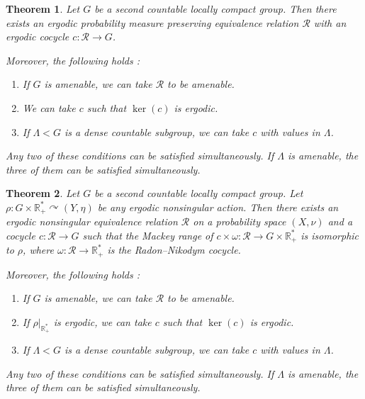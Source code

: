 \documentclass[10pt,a4paper]{amsart}
\newtheorem{theorem}{Theorem}
\newcommand{\R}{\mathbb{R}}
\newcommand{\cR}{\mathcal{R}}
\begin{document}
\begin{theorem} \label{model ergodic kernel dense subgroup measure preserving case}
    Let $G$ be a second countable locally compact group. Then there exists an ergodic probability measure preserving equivalence relation $\cR$ with an ergodic cocycle $c : \cR \rightarrow G$.

    Moreover, the following holds :
    \begin{enumerate}
        \item If $G$ is amenable, we can take $\cR$ to be amenable.
        \item We can take $c$ such that $\ker(c)$ is ergodic.
        \item If $\Lambda < G$ is a dense countable subgroup, we can take $c$ with values in $\Lambda$.
    \end{enumerate}
    Any two of these conditions can be satisfied simultaneously. If $\Lambda$ is amenable, the three of them can be satisfied simultaneously.
\end{theorem} 

\begin{theorem} \label{model ergodic kernel dense subgroup}
    Let $G$ be a second countable locally compact group. Let $\rho : G \times \R^*_+ \curvearrowright (Y,\eta)$ be any ergodic nonsingular action. Then there exists an ergodic nonsingular equivalence relation $\cR$ on a probability space $(X,\nu)$ and a cocycle $c : \cR \rightarrow G$ such that the Mackey range of $c \times \omega : \cR \rightarrow G \times \R^*_+$ is isomorphic to $\rho$, where $\omega : \cR \rightarrow \R^*_+$ is the Radon--Nikodym cocycle.

    Moreover, the following holds :
    \begin{enumerate}
        \item If $G$ is amenable, we can take $\cR$ to be amenable.
        \item If $\rho|_{\R^*_+}$ is ergodic, we can take $c$ such that $\ker(c)$ is ergodic.
        \item If $\Lambda < G$ is a dense countable subgroup, we can take $c$ with values in $\Lambda$.
    \end{enumerate}
    Any two of these conditions can be satisfied simultaneously. If $\Lambda$ is amenable, the three of them can be satisfied simultaneously.
\end{theorem}
\end{document}
